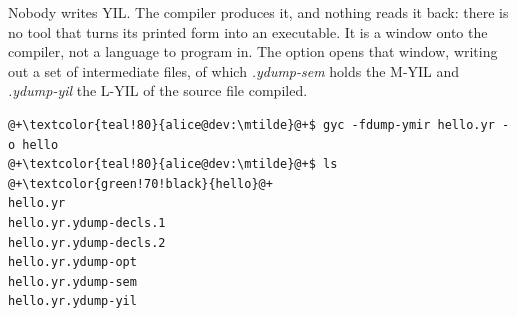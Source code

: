 Nobody writes YIL. The compiler produces it, and nothing reads it back: there is
no tool that turns its printed form into an executable. It is a window onto the
compiler, not a language to program in. The option  opens that
window, writing out a set of intermediate files, of which \textit{.ydump-sem}
holds the M-YIL and \textit{.ydump-yil} the L-YIL of the source file compiled.

\begin{lstlisting}[style=bashVerb, escapechar=@+]
@+\textcolor{teal!80}{alice@dev:\mtilde}@+$ gyc -fdump-ymir hello.yr -o hello
@+\textcolor{teal!80}{alice@dev:\mtilde}@+$ ls
@+\textcolor{green!70!black}{hello}@+
hello.yr
hello.yr.ydump-decls.1
hello.yr.ydump-decls.2
hello.yr.ydump-opt
hello.yr.ydump-sem
hello.yr.ydump-yil
\end{lstlisting}

\vfill
\pagebreak

